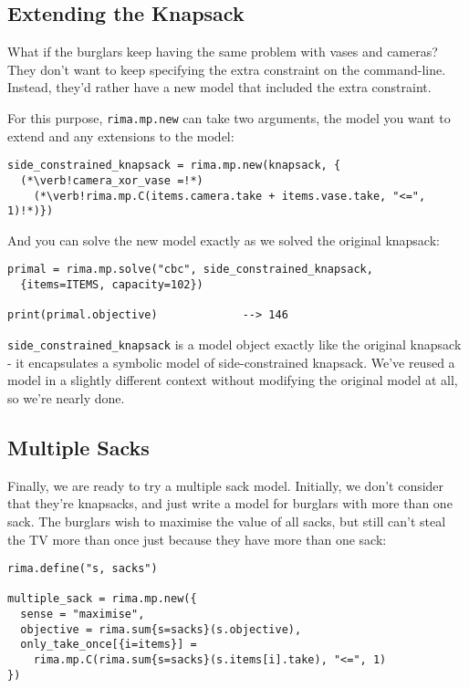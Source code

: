 \documentclass[a4paper,12pt]{article}
\begin{document}
\subsection{Extending the Knapsack}

What if the burglars keep having the same problem with vases and cameras?
They don't want to keep specifying the extra constraint on the command-line.
Instead, they'd rather have a new model that included the extra constraint.

For this purpose, \lstinline!rima.mp.new! can take two arguments,
the model you want to extend and any extensions to the model:
  \begin{lstlisting}
side_constrained_knapsack = rima.mp.new(knapsack, {
  (*\verb!camera_xor_vase =!*)
    (*\verb!rima.mp.C(items.camera.take + items.vase.take, "<=", 1)!*)})
  \end{lstlisting}

And you can solve the new model exactly as we solved the original knapsack:
  \begin{lstlisting}
primal = rima.mp.solve("cbc", side_constrained_knapsack,
  {items=ITEMS, capacity=102})

print(primal.objective)             --> 146
  \end{lstlisting}

\lstinline!side_constrained_knapsack! is a model object exactly like the original knapsack -
it encapsulates a symbolic model of side-constrained knapsack.
We've reused a model in a slightly different context without modifying the original model at all,
so we're nearly done.

\subsection{Multiple Sacks}

Finally, we are ready to try a multiple sack model.
Initially, we don't consider that they're knapsacks,
and just write a model for burglars with more than one sack.
The burglars wish to maximise the value of all sacks,
but still can't steal the TV more than once just because they have more than one sack:

  \begin{lstlisting}
rima.define("s, sacks")

multiple_sack = rima.mp.new({
  sense = "maximise",
  objective = rima.sum{s=sacks}(s.objective),
  only_take_once[{i=items}] =
    rima.mp.C(rima.sum{s=sacks}(s.items[i].take), "<=", 1)
})
  \end{lstlisting}
\end{document}

